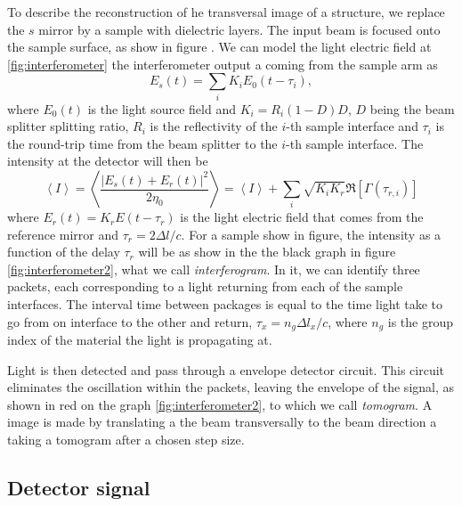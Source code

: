 \documentclass[12pt,twoside,english]{book}
\renewcommand{\~}{\perispomeni}%
\numberwithin{equation}{section}
\numberwithin{figure}{section}
\begin{document}
To describe the reconstruction of he transversal image of a structure, we replace the $s$ mirror by a sample with dielectric layers. The input beam is focused onto the sample surface, as show in figure . We can model the light electric field at \ref{fig:interferometer} the interferometer output a coming from the sample arm as
\begin{equation}
E_{s}\left(t\right)=\sum_{i}K_{i}E_{0}\left(t-\tau_{i}\right),\end{equation}
where $E_{0}\left(t\right)$ is the light source field and $K_{i}=R_{i}\left(1-D\right)D$, $D$ being the beam splitter splitting ratio, $R_{i}$ is the reflectivity of the $i$-th sample interface and $\tau_{i}$ is the round-trip time from the beam splitter to the $i$-th sample interface. The intensity at the detector will then be
\begin{equation}
\left\langle I\right\rangle =\left\langle \frac{\left|E_{s}\left(t\right)+E_{r}\left(t\right)\right|^{2}}{2\eta_{0}}\right\rangle =\left\langle I\right\rangle +\sum_{i}\sqrt{K_{i}K_{r}}\Re\left[\Gamma\left(\tau_{r,i}\right)\right]\end{equation}
where $E_{r}\left(t\right)=K_{r}E\left(t-\tau_{r}\right)$ is the light electric field that comes from the reference mirror and $\tau_{r}=2\Delta l/c$. For a sample show in figure, the intensity as a function of the delay $\tau_{r}$ will be as show in the the black graph in figure \ref{fig:interferometer2}, what we call \emph{interferogram}. In it, we can identify three packets, each corresponding to a light returning from each of the sample interfaces.
The interval time between packages is equal to the time light take to go from on interface to the other and return, $\tau_{x}=n_{g}\Delta l_{x}/c$, where $n_{g}$ is the group index of the material the light is propagating at.

Light is then detected and pass through a envelope detector circuit. This circuit eliminates the oscillation within the packets, leaving the envelope of the signal, as shown in red on the graph \ref{fig:interferometer2}, to which we call \emph{tomogram}. A image is made by translating a the beam transversally to the beam direction a taking a tomogram after a chosen step size.


\subsection{Detector signal}
\end{document}
